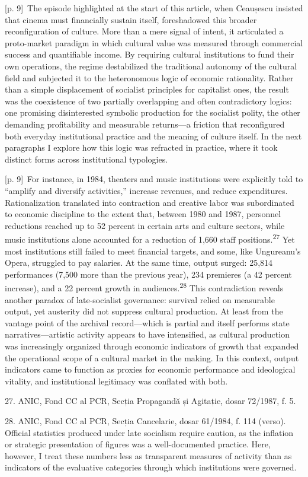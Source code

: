 \documentclass[10pt,a4paper]{article}
\begin{document}
{\scriptsize\color{gray} [p. 9]}\ The episode highlighted at the start of this article, when Ceaușescu insisted that cinema must financially sustain itself, foreshadowed this broader reconfiguration of culture. More than a mere signal of intent, it articulated a proto-market paradigm in which cultural value was measured through commercial success and quantifiable income. By requiring cultural institutions to fund their own operations, the regime destabilized the traditional autonomy of the cultural field and subjected it to the heteronomous logic of economic rationality. Rather than a simple displacement of socialist principles for capitalist ones, the result was the coexistence of two partially overlapping and often contradictory logics: one promising disinterested symbolic production for the socialist polity, the other demanding profitability and measurable returns—a friction that reconfigured both everyday institutional practice and the meaning of culture itself. In the next paragraphs I explore how this logic was refracted in practice, where it took distinct forms across institutional typologies.\par
{\scriptsize\color{gray} [p. 9]}\ For instance, in 1984, theaters and music institutions were explicitly told to “amplify and diversify activities,” increase revenues, and reduce expenditures. Rationalization translated into contraction and creative labor was subordinated to economic discipline to the extent that, between 1980 and 1987, personnel reductions reached up to 52 percent in certain arts and culture sectors, while music institutions alone accounted for a reduction of 1,660 staff positions.\nobreak\textsuperscript{27} Yet most institutions still failed to meet financial targets, and some, like Ungureanu’s Opera, struggled to pay salaries. At the same time, output surged: 25,814 performances (7,500 more than the previous year), 234 premieres (a 42 percent increase), and a 22 percent growth in audiences.\nobreak\textsuperscript{28} This contradiction reveals another paradox of late-socialist governance: survival relied on measurable output, yet austerity did not suppress cultural production. At least from the vantage point of the archival record—which is partial and itself performs state narratives—artistic activity appears to have intensified, as cultural production was increasingly organized through economic indicators of growth that expanded the operational scope of a cultural market in the making. In this context, output indicators came to function as proxies for economic performance and ideological vitality, and institutional legitimacy was conflated with both.\par{\small 27. ANIC, Fond CC al PCR, Secția Propagandă și Agitație, dosar 72/1987, f. 5.\par}{\small 28. ANIC, Fond CC al PCR, Secția Cancelarie, dosar 61/1984, f. 114 (verso). Official statistics produced under late socialism require caution, as the inflation or strategic presentation of figures was a well-documented practice. Here, however, I treat these numbers less as transparent measures of activity than as indicators of the evaluative categories through which institutions were governed.\par}
\end{document}
